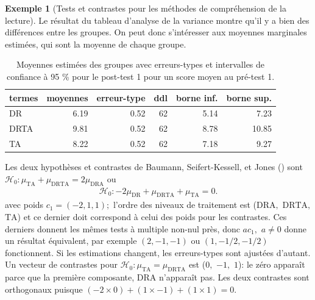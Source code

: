 \documentclass[
  11pt,
  letterpaper,
]{scrbook}
\theoremstyle{plain}
\theoremstyle{plain}
\theoremstyle{definition}
\newtheorem{example}{Exemple}[chapter]
\theoremstyle{definition}
\theoremstyle{remark}
\begin{document}
\begin{example}[Tests et contrastes pour les méthodes de compréhension
de la
lecture]
Le résultat du tableau d'analyse de la variance montre qu'il y a bien
des différences entre les groupes. On peut donc s'intéresser aux
moyennes marginales estimées, qui sont la moyenne de chaque groupe.

\begin{longtable}[]{@{}lrrrrr@{}}

\caption{\label{tbl-print-pairwise-baumann}Moyennes estimées des groupes
avec erreurs-types et intervalles de confiance à 95 \% pour le post-test
1 pour un score moyen au pré-test 1.}

\tabularnewline

\toprule\noalign{}
termes & moyennes & erreur-type & ddl & borne inf. & borne sup. \\
\midrule\noalign{}
\endhead
\bottomrule\noalign{}
\endlastfoot
DR & 6.19 & 0.52 & 62 & 5.14 & 7.23 \\
DRTA & 9.81 & 0.52 & 62 & 8.78 & 10.85 \\
TA & 8.22 & 0.52 & 62 & 7.18 & 9.27 \\

\end{longtable}

Les deux hypothèses et contrastes de Baumann, Seifert-Kessell, et Jones
() sont
\(\mathscr{H}_0: \mu_{\mathrm{TA}} + \mu_{\mathrm{DRTA}} = 2 \mu_{\mathrm{DRA}}\)
ou \begin{align*}
\mathscr{H}_0: - 2 \mu_{\mathrm{DR}} + \mu_{\mathrm{DRTA}} + \mu_{\mathrm{TA}} = 0.
\end{align*} avec poids \(c_1=(-2, 1, 1);\) l'ordre des niveaux de
traitement est (\(\mathrm{DRA},\) \(\mathrm{DRTA},\) \(\mathrm{TA}\)) et
ce dernier doit correspond à celui des poids pour les contrastes. Ces
derniers donnent les mêmes tests à multiple non-nul près, donc \(ac_1,\)
\(a \neq 0\) donne un résultat équivalent, par exemple \((2, -1, -1)\)
ou \((1, -1/2, -1/2)\) fonctionnent. Si les estimations changent, les
erreurs-types sont ajustées d'autant. Un vecteur de contrastes pour
\(\mathscr{H}_0:  \mu_{\mathrm{TA}} = \mu_{\mathrm{DRTA}}\) est (\(0,\)
\(-1,\) \(1\)): le zéro apparaît parce que la première composante,
\(\mathrm{DRA}\) n'apparaît pas. Les deux contrastes sont orthogonaux
puisque \((-2 \times 0) + (1 \times -1) + (1 \times 1) = 0.\)


\end{example}
\end{document}
